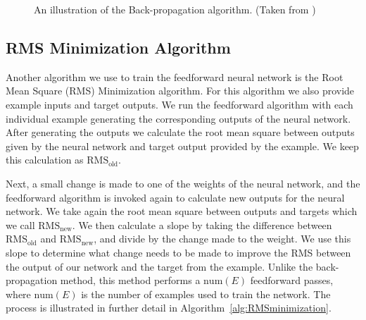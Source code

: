\documentclass[11pt]{article}
\begin{document}
\begin{figure}[]
		\caption{An illustration of the Back-propagation algorithm. (Taken from \cite{vlsibackp_t})}
	\label{fig:figures_backpgtn}	
\end{figure}


\subsection{RMS Minimization Algorithm} %
\label{sub:rms_minimization_algorithm}

Another algorithm we use to train the feedforward neural network is the Root Mean Square (RMS) Minimization algorithm. For this
algorithm we also provide example inputs and target outputs. We run the feedforward algorithm with each individual example generating
the corresponding outputs of the neural network. After generating the outputs we calculate the root mean square between outputs given by
the neural network and target output provided by the example. We keep this calculation as $\mbox{RMS}_{\mbox{old}}$.

Next, a small change is made to one of the weights of the neural network, and the feedforward algorithm is invoked again to calculate
new outputs for the neural network. We take again the root mean square between outputs and targets which we call
$\mbox{RMS}_{\mbox{new}}$. We then calculate a slope by taking the difference between $\mbox{RMS}_{\mbox{old}}$ and
$\mbox{RMS}_{\mbox{new}}$, and divide by the change made to the weight. We use this slope to determine what change needs to be made to
improve the RMS between the output of our network and the target from the example. Unlike the back-propagation method, this method
performs a $\mbox{num}(E)$ feedforward passes, where $\mbox{num}(E)$ is the number of examples used to train the network. The process is
illustrated in further detail in Algorithm~\ref{alg:RMSminimization}.
\end{document}
